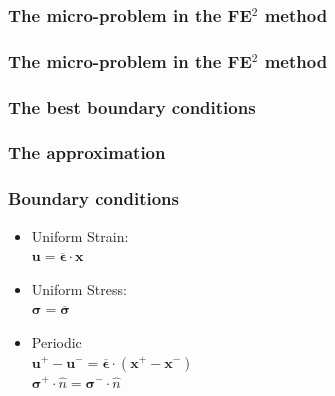 \documentclass[usenames,dvipsnames]{beamer}
\begin{document}

\begin{frame}
\frametitle{The micro-problem in the FE$^2$ method}
\begin{figure}[!ht]
\resizebox{0.8\linewidth}{!}{}
\end{figure}
\end{frame}


\begin{frame}
\frametitle{The micro-problem in the FE$^2$ method}
\begin{figure}[!ht]
\resizebox{1.0\linewidth}{!}{}
\end{figure}
\end{frame}


\begin{frame}
\frametitle{The best boundary conditions}
\begin{figure}[!ht]
\resizebox{0.6\linewidth}{!}{}
\end{figure}
\end{frame}


\begin{frame}
\frametitle{The approximation}
\begin{figure}[!ht]
\resizebox{0.6\linewidth}{!}{}
\end{figure}
\end{frame}


\begin{frame}
\frametitle{Boundary conditions}

\begin{minipage}[h]{0.49\linewidth}
\begin{itemize}
\item Uniform Strain: \\ $\bm{u} = \overline{\bm{\epsilon}} \cdot \bm{x} $
  \vspace{0.5cm}
\item Uniform Stress: \\$ \bm{\sigma} = \overline{\bm{\sigma}} $
  \vspace{0.5cm}
\item Periodic \\
$ \bm{u}^+ - \bm{u}^- = \overline{\bm{\epsilon}} \cdot (\bm{x}^+ - \bm{x}^-) $\\
$ \bm{\sigma}^+ \cdot \hat{n}  = \bm{\sigma}^- \cdot \hat{n}$
\end{itemize}
\end{minipage}
\begin{minipage}[h]{0.49\linewidth}
\resizebox{0.8\linewidth}{!}{}
\end{minipage}

\end{frame}
\end{document}
